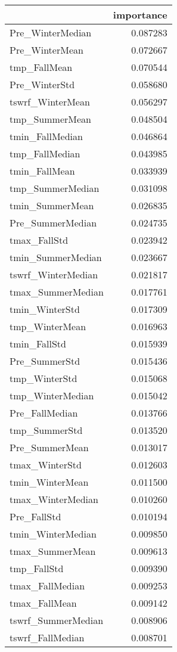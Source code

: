 \begin{tabular}{lr}
\toprule
 & importance \\
\midrule
Pre_WinterMedian & 0.087283 \\
Pre_WinterMean & 0.072667 \\
tmp_FallMean & 0.070544 \\
Pre_WinterStd & 0.058680 \\
tswrf_WinterMean & 0.056297 \\
tmp_SummerMean & 0.048504 \\
tmin_FallMedian & 0.046864 \\
tmp_FallMedian & 0.043985 \\
tmin_FallMean & 0.033939 \\
tmp_SummerMedian & 0.031098 \\
tmin_SummerMean & 0.026835 \\
Pre_SummerMedian & 0.024735 \\
tmax_FallStd & 0.023942 \\
tmin_SummerMedian & 0.023667 \\
tswrf_WinterMedian & 0.021817 \\
tmax_SummerMedian & 0.017761 \\
tmin_WinterStd & 0.017309 \\
tmp_WinterMean & 0.016963 \\
tmin_FallStd & 0.015939 \\
Pre_SummerStd & 0.015436 \\
tmp_WinterStd & 0.015068 \\
tmp_WinterMedian & 0.015042 \\
Pre_FallMedian & 0.013766 \\
tmp_SummerStd & 0.013520 \\
Pre_SummerMean & 0.013017 \\
tmax_WinterStd & 0.012603 \\
tmin_WinterMean & 0.011500 \\
tmax_WinterMedian & 0.010260 \\
Pre_FallStd & 0.010194 \\
tmin_WinterMedian & 0.009850 \\
tmax_SummerMean & 0.009613 \\
tmp_FallStd & 0.009390 \\
tmax_FallMedian & 0.009253 \\
tmax_FallMean & 0.009142 \\
tswrf_SummerMedian & 0.008906 \\
tswrf_FallMedian & 0.008701 \\

\end{tabular}
